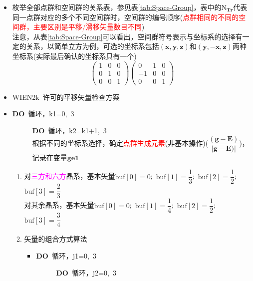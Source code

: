 \documentclass{article}      %
\begin{document}
\begin{itemize}
	\item 枚举全部点群和空间群的关系表，参见表\ref{tab:Space-Group}，表中的$\mathrm{N}_{\mathbf{Tr}}$代表同一点群对应的多个不同空间群时，空间群的编号顺序(\textcolor{red}{点群相同的不同的空间群，主要区别是平移/滑移矢量数目不同})\\
注意，从表\ref{tab:Space-Group}可以看出，空间群符号表示与坐标系的选择有一定的关系，以简单立方为例，可选的坐标系包括$(\mathbf{x},\mathbf{y},\mathbf{z})$和$(\mathbf{y},\mathbf{-x},\mathbf{z})$两种坐标系(实际最后确认的坐标系只有一个)
								\begin{displaymath}
									\begin{pmatrix}
										1 &0 &0\\
										0 &1 &0\\
										0 &0 &1
									\end{pmatrix}
									\begin{pmatrix}
										0 &1 &0\\
										-1 &0 &0\\
										0 &0 &1
									\end{pmatrix}
								\end{displaymath}
	\item \textrm{WIEN2k}~许可的平移矢量检查方案
					\item \textbf{DO}~循环，\textrm{k1}=0,~3
						\begin{description}
							\item[] \textbf{DO}~循环，\textrm{k2}=k1+1,~3\\
								根据不同的坐标系选择，确定\textcolor{red}{点群生成元素}(非基本操作)($\dfrac{(\mathbf{g}-\mathbf{E})}{|\mathbf{g}-\mathbf{E})|}$)，记录在变量$\mathbf{ge1}$
						\end{description}
		\begin{enumerate}
			\item 对\textcolor{magenta}{三方和六方}晶系，基本矢量$\mathrm{buf[0]}=0$;~$\mathrm{buf[1]}=\dfrac13$;~$\mathrm{buf[2]}=\dfrac12$;~$\mathrm{buf[3]}=\dfrac23$ \\ 对其余晶系，基本矢量$\mathrm{buf[0]}=0$;~$\mathrm{buf[1]}=\dfrac14$;~$\mathrm{buf[2]}=\dfrac12$;~$\mathrm{buf[3]}=\dfrac34$
			\item	矢量的组合方式算法
				\begin{itemize}
					\item \textbf{DO}~循环，\textrm{j1}=0,~3
						\begin{description}
							\item[] \textbf{DO}~循环，\textrm{j2}=0,~3\\

\end{description}
\end{itemize}
\end{enumerate}
\end{itemize}
\end{document}
